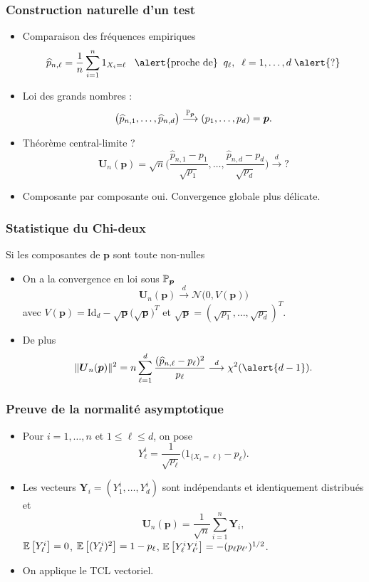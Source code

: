 \begin{frame}
\frametitle{Construction  naturelle d'un test}
\begin{itemize}
\item \alert{Comparaison des fréquences empiriques}
$$\widehat p_{n,\ell}=\frac{1}{n}\sum_{i=1}^n 1_{X_i=\ell}\;\;\;\text{\alert{proche de}}\;\;q_\ell,\;\;\ell=1,\ldots, d\; \alert{?}$$
\item Loi des grands nombres :
$$\big(\widehat p_{n,1},\ldots, \widehat p_{n,d}\big) \stackrel{\operatorname{{\mathbb P}}_{{\boldsymbol p}}}{\longrightarrow} (p_1,\ldots, p_d)={\boldsymbol p}.$$
\item \alert{Théorème central-limite ?}
$${\boldsymbol{U}_n}(\boldsymbol{p})=\sqrt{n}\Big(\frac{\widehat p_{n,1}-p_1}{\sqrt{p_1}},\ldots, \frac{\widehat p_{n,d}-p_d}{\sqrt{p_d}}\Big) \stackrel{d}{\longrightarrow} ?$$
\item Composante par composante oui. \alert{Convergence globale plus délicate}.
\end{itemize}
\end{frame}

\begin{frame}
\frametitle{Statistique du Chi-deux}
\begin{prop}
Si les composantes de $\boldsymbol{p}$ sont toute non-nulles
\begin{itemize}
\item On a la \alert{convergence en loi} sous $\operatorname{{\mathbb P}}_{\boldsymbol{p}}$
$${\boldsymbol{U}_n}(\boldsymbol{p})\stackrel{d}{\longrightarrow} {\mathcal N}\big(0,V(\boldsymbol{p})\big)$$
avec $V(\boldsymbol{p}) = \mathrm{Id}_d-\sqrt{\boldsymbol{p}}\big(\sqrt{\boldsymbol{p}}\big)^T$ et $\sqrt{\boldsymbol{p}} = (\sqrt{p_1},\ldots, \sqrt{p_d})^T$.
\item \alert{De plus}
$$\|{\boldsymbol{U}_n}(\boldsymbol{p})\|^2 = n\sum_{\ell=1}^d \frac{(\widehat p_{n,\ell}-p_\ell)^2}{p_\ell} \stackrel{d}{\longrightarrow} \chi^2(\alert{d-1}).$$
\end{itemize}
\end{prop}
\end{frame}

\begin{frame}
\frametitle{Preuve de la normalité asymptotique}
\begin{itemize}
\item Pour $i=1,\ldots, n$ et $1 \leq \ell \leq d$, on pose
$$Y_\ell^i=\frac{1}{\sqrt{p_\ell}}\big(1_{\{X_i=\ell\}}-p_\ell\big).$$
\item Les vecteurs ${\boldsymbol Y}_i=(Y_1^i,\ldots, Y_d^i)$ sont \alert{indépendants et identiquement distribués} et
$${\boldsymbol U}_n(\boldsymbol{p}) = \frac{1}{\sqrt{n}}\sum_{i = 1}^n {\boldsymbol Y}_i,$$
$\operatorname{{\mathbb E}}\big[Y_\ell^i\big]=0$, $\operatorname{{\mathbb E}}\big[(Y_\ell^i)^2\big]=1-p_\ell$, $\operatorname{{\mathbb E}}\big[Y_\ell^iY_{\ell'}^i \big]=-(p_\ell p_{\ell'})^{1/2}$.
\item \alert{On applique le TCL vectoriel}.
\end{itemize}
\end{frame}

